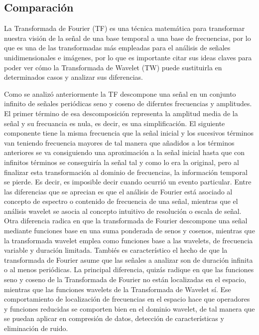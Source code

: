 \documentclass[a4paper,10pt,twocolumn]{article}
\begin{document}
\subsection{Comparación}\label{sub:compara}
 La Transformada de Fourier (TF) es una técnica matemática para transformar	nuestra visión de la señal de una base temporal a una base de frecuencias, por lo que es una de las transformadas más empleadas para el análisis de señales unidimensionales e imágenes, por lo que es importante citar sus ideas claves para poder ver cómo la Transformada de Wavelet (TW) puede sustituirla en determinados casos y analizar sus diferencias.

 Como se analizó anteriormente la TF descompone una señal en un conjunto infinito de señales periódicas seno y coseno de diferntes frecuencias y amplitudes. El primer término de esa descomposición representa la amplitud media de la señal y su frecuancia es nula, es decir, es una simplificación. El siguiente componente tiene la misma frecuencia que la señal inicial y los sucesivos términos van teniendo frecuencia mayores de tal manera que añadidos a los términos anteriores se va consiguiendo una aproximación a la señal inicial hasta que con infinitos términos se conseguiría la señal tal y como lo era la original, pero al finalizar esta transformación al dominio de frecuencias, la información temporal se pierde. Es decir, es imposible decir cuando ocurrió un evento particular. Entre las diferencias que se aprecian es que el análisis de Fourier está asociado al concepto de espectro o contenido de frecuencia de una señal, mientras que el análisis wavelet se asocia al concepto intuitivo de resolución o escala de señal. Otra diferencia radica en que la transformada de Fourier descompone una señal mediante funciones base en una suma ponderada de senos y cosenos, mientras que la transformada wavelet emplea como funciones base a las wavelets, de frecuencia variable y duración limitada. Tambiés es característico el hecho de que la transformada de Fourier asume que las señales a analizar son de duración infinita o al menos periódicas. La principal diferencia, quizás radique en que las funciones seno y coseno de la Transformada de Fourier no están  localizadas en el espacio, mientras que las funciones wavelets de la Transformada de Wavelet sí. Ese comportamiento de localización de frecuencias en el espacio hace que operadores y funciones reducidas se comporten bien en el dominio wavelet, de tal manera que se puedan aplicar en compresión de datos, detección de características y eliminación de ruido.
  
\end{document}
